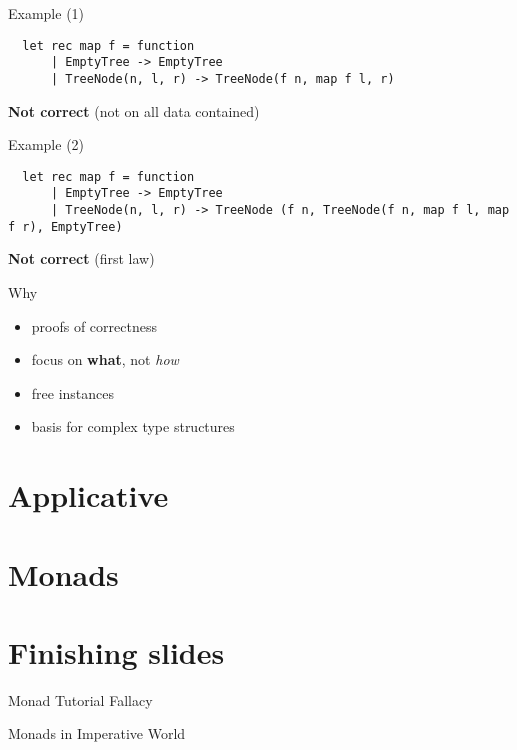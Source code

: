 \documentclass{beamer}
\begin{document}
\begin{frame}[fragile]{Example (1)}
  \small
  \begin{verbatim}
  let rec map f = function
      | EmptyTree -> EmptyTree
      | TreeNode(n, l, r) -> TreeNode(f n, map f l, r)
  \end{verbatim}
  \pause
  \textbf{Not correct} (not on all data contained)
\end{frame}

\begin{frame}[fragile]{Example (2)}
  \tiny
  \begin{verbatim}
  let rec map f = function
      | EmptyTree -> EmptyTree
      | TreeNode(n, l, r) -> TreeNode (f n, TreeNode(f n, map f l, map f r), EmptyTree)
  \end{verbatim}
  \pause
  \textbf{Not correct} (first law)
\end{frame}

\begin{frame}{Why}
  \begin{itemize}[<+->]
    \item proofs of correctness
    \item focus on \textbf{what}, not \textit{how}
    \item free instances
    \item basis for complex type structures
  \end{itemize}
\end{frame}

\section{Applicative}
\frame{\tableofcontents[currentsection]}

\section{Monads}
\frame{\tableofcontents[currentsection]}

\section{Finishing slides}
\frame{\tableofcontents[currentsection]}

\begin{frame}{Monad Tutorial Fallacy}
\end{frame}

\begin{frame}{Monads in Imperative World}
\end{frame}
\end{document}
